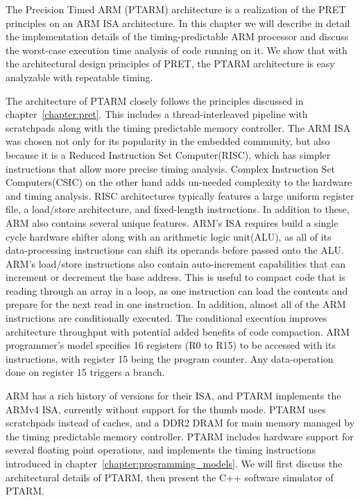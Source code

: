 The Precision Timed ARM (PTARM) architecture is a realization of the PRET principles on an ARM ISA architecture. 
In this chapter we will describe in detail the implementation details of the timing-predictable ARM processor and discuss the worst-case execution time analysis of code running on it.
We show that with the architectural design principles of PRET, the PTARM architecture is easy analyzable with repeatable timing.
  
The architecture of PTARM closely follows the principles discussed in chapter~\ref{chapter:pret}.
This includes a thread-interleaved pipeline with scratchpads along with the timing predictable memory controller.
The ARM ISA was chosen not only for its popularity in the embedded community, but also because it is a Reduced Instruction Set Computer(RISC), which has simpler instructions that allow more precise timing analysis. 
Complex Instruction Set Computers(CSIC) on the other hand adds un-needed complexity to the hardware and timing analysis.
RISC architectures typically features a large uniform register file, a load/store architecture, and fixed-length instructions.
In addition to these, ARM also contains several unique features.
ARM's ISA requires build a single cycle hardware shifter along with an arithmetic logic unit(ALU), as all of its data-processing instructions can shift its operands before passed onto the ALU. 
ARM's load/store instructions also contain auto-increment capabilities that can increment or decrement the base address. 
This is useful to compact code that is reading through an array in a loop, as one instruction can load the contents and prepare for the next read in one instruction.
In addition, almost all of the ARM instructions are conditionally executed.
The conditional execution improves architecture throughput with potential added benefits of code compaction.     
ARM programmer's model specifies 16 registers (R0 to R15) to be accessed with its instructions, with register 15 being the program counter. 
Any data-operation done on register 15 triggers a branch.  

ARM has a rich history of versions for their ISA, and PTARM implements the ARMv4 ISA, currently without support for the thumb mode.
PTARM uses scratchpads instead of caches, and a DDR2 DRAM for main memory managed by the timing predictable memory controller.
PTARM includes hardware support for several floating point operations, and implements the timing instructions introduced in chapter~\ref{chapter:programming_models}.   
We will first discuss the architectural details of PTARM, then present the C++ software simulator of PTARM.   
   

